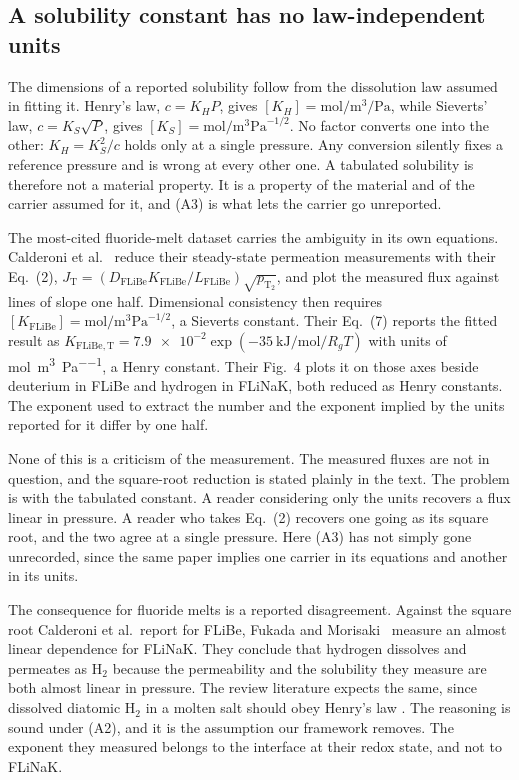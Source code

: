 \documentclass[5p]{elsarticle}
\begin{document}
\subsection{A solubility constant has no law-independent units}
\label{sec:units}

The dimensions of a reported solubility follow from the dissolution law assumed in fitting it.
Henry's law, $c = K_H P$, gives $[K_H] = \unit{\mole\per\cubic\metre\per\pascal}$, while Sieverts' law, $c = K_S\sqrt{P}$, gives $[K_S] = \unit{\mole\per\cubic\metre\pascal\tothe{-1/2}}$.
No factor converts one into the other: $K_H = K_S^{2}/c$ holds only at a single pressure.
Any conversion silently fixes a reference pressure and is wrong at every other one.
A tabulated solubility is therefore not a material property. 
It is a property of the material and of the carrier assumed for it, and (A3) is what lets the carrier go unreported.

The most-cited fluoride-melt dataset carries the ambiguity in its own equations.
Calderoni et al.~\cite{calderoni_measurement_2008} reduce their steady-state permeation measurements with their Eq.~(2), $J_{\mathrm{T}} = (D_{\mathrm{FLiBe}} K_{\mathrm{FLiBe}} / L_{\mathrm{FLiBe}}) \sqrt{p_{\mathrm{T_2}}}$, and plot the measured flux against lines of slope one half. 
Dimensional consistency then requires $[K_{\mathrm{FLiBe}}] = \unit{\mole\per\cubic\metre\pascal\tothe{-1/2}}$, a Sieverts constant.
Their Eq.~(7) reports the fitted result as $K_{\mathrm{FLiBe},\mathrm{T}} = \num{7.9e-2}\exp(-\qty{35}{\kilo\joule\per\mole}/R_g T)$ with units of \unit{\mole\per\cubic\metre\per\pascal}, a Henry constant.
Their Fig.~4 plots it on those axes beside deuterium in FLiBe and hydrogen in FLiNaK, both reduced as Henry constants.
The exponent used to extract the number and the exponent implied by the units reported for it differ by one half.

None of this is a criticism of the measurement.
The measured fluxes are not in question, and the square-root reduction is stated plainly in the text.
The problem is with the tabulated constant.
A reader considering only the units recovers a flux linear in pressure.
A reader who takes Eq.~(2) recovers one going as its square root, and the two agree at a single pressure.
Here (A3) has not simply gone unrecorded, since the same paper implies one carrier in its equations and another in its units.

The consequence for fluoride melts is a reported disagreement.
Against the square root Calderoni et al.\ report for FLiBe, Fukada and Morisaki~\cite{satoshi_fukada_hydrogen_2006} measure an almost linear dependence for FLiNaK.
They conclude that hydrogen dissolves and permeates as $\mathrm{H_2}$ because the permeability and the solubility they measure are both almost linear in pressure.
The review literature expects the same, since dissolved diatomic $\mathrm{H_2}$ in a molten salt should obey Henry's law \cite{forsberg_fusion_2020}.
The reasoning is sound under (A2), and it is the assumption our framework removes.
The exponent they measured belongs to the interface at their redox state, and not to FLiNaK.
\end{document}
